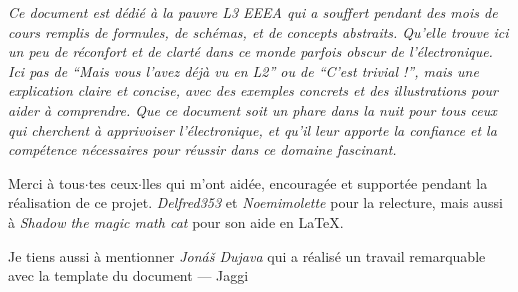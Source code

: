 \cleardoublepage
{}

{ \slshape
    Ce document est d\'edi\'e \`a la pauvre L3 EEEA qui a souffert pendant des mois de cours remplis de formules, de sch\'emas, et de concepts abstraits. Qu'elle trouve ici un peu de r\'econfort et de clart\'e dans ce monde parfois obscur de l'\'electronique. Ici pas de ``Mais vous l'avez d\'ej\`a vu en L2'' ou de ``C'est trivial !'', mais une explication claire et concise, avec des exemples concrets et des illustrations pour aider \`a comprendre. Que ce document soit un phare dans la nuit pour tous ceux qui cherchent \`a apprivoiser l'\'electronique, et qu'il leur apporte la confiance et la comp\'etence n\'ecessaires pour r\'eussir dans ce domaine fascinant.\par
    \bigskip
    Merci \`a tous$\cdot$tes ceux$\cdot$lles qui m'ont aid\'ee, encourag\'ee et support\'ee pendant la r\'ealisation de ce projet. \emph{Delfred353} et \emph{Noemimolette} pour la relecture, mais aussi \`a \emph{Shadow the magic math cat} pour son aide en \LaTeX.\par
    \bigskip
    Je tiens aussi \`a mentionner \emph{Jon\'a\v{s} Dujava} qui a r\'ealis\'e un travail remarquable avec la template du document \autocite{TeXtured}
    --- Jaggi
}

\vfill
